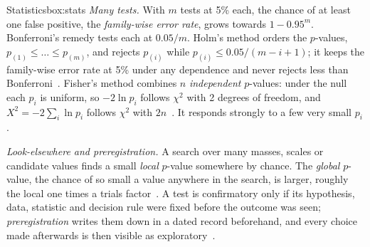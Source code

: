 \begin{primer}{Statistics}{box:stats}
\emph{Many tests.} With $m$ tests at 5\% each, the chance of at least one false positive, the \emph{family-wise error rate}, grows towards
$1-0.95^m$. Bonferroni's remedy tests each at $0.05/m$. Holm's method orders the $p$-values, $p_{(1)}\le\dots\le p_{(m)}$, and rejects
$p_{(i)}$ while $p_{(i)}\le0.05/(m-i+1)$; it keeps the family-wise error rate at 5\% under any dependence and never rejects less than
Bonferroni~\cite{holm1979}. Fisher's method combines $n$ \emph{independent} $p$-values: under the null each $p_i$ is uniform, so
$-2\ln p_i$ follows $\chi^2$ with 2 degrees of freedom, and $X^2=-2\sum_i\ln p_i$ follows $\chi^2$ with $2n$~\cite{fisher1932}. It responds
strongly to a few very small $p_i$.

\emph{Look-elsewhere and preregistration.} A search over many masses, scales or candidate values finds a small \emph{local} $p$-value
somewhere by chance. The \emph{global} $p$-value, the chance of so small a value anywhere in the search, is larger, roughly the local one
times a trials factor~\cite{grossvitells2010}. A test is confirmatory only if its hypothesis, data, statistic and decision rule were
fixed before the outcome was seen; \emph{preregistration} writes them down in a dated record beforehand, and every choice made afterwards
is then visible as exploratory~\cite{nosek2018}.
\end{primer}
